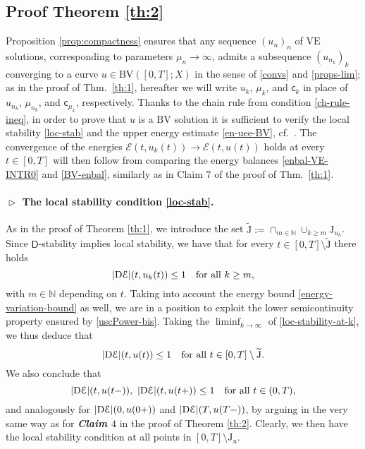 \documentclass[a4paper,10pt,reqno]{amsart} %
\newcommand{\N}{\mathbb{N}}
\numberwithin{equation}{section}
\def\rmD{{\mathrm D}} \def\rmE{{\mathrm E}} \def\rmF{{\mathrm F}}
\newcommand{\Xs}{X}
\newcommand{\BV}{\mathrm{BV}}
\newcommand{\ene}[2]{\mathcal{E}(#1,#2)}
\newcommand{\cmdn}{\mathsf{D}}
\newcommand{\lli}[2]{{#1}({#2}{-})}
\newcommand{\rli}[2]{{#1}({#2}{+})}
\newcommand{\jump}[1]{\mathrm{J}_{#1}}
\newcommand{\tjump}{\widetilde{\mathrm{J}}}
\newcommand{\vecostnamep}[1]{\mathsf{c}_{#1}}
\newcommand{\VE}{\mathrm{VE}}
\newcommand{\slope}[3]{|\rmD {#1}|(#2,#3)}
\begin{document}
\subsection{Proof Theorem \ref{th:2}}
\label{ss:4.2}
Proposition \ref{prop:compactness} ensures that any sequence
 $(u_n)_n$ of  $\VE$ solutions, corresponding to parameters $\mu_n\to\infty$, admits a subsequence
  	$(u_{n_k})_k$  converging to a curve   $u\in \BV([0,T];\Xs)$ in the sense of   \eqref{convs} and  \eqref{props-lim};  as in the proof of Thm.\ \ref{th:1},  hereafter %
	we will write $u_k$,  $\mu_k$, and  $\vecostnamep k$ in place of 
	$u_{n_k}$, $\mu_{n_k}$, and 
	$\vecostnamep{\mu_{k}}$, respectively. 
Thanks  to the  chain rule from condition \eqref{ch-rule-ineq},  
 in order to prove  that $u$ is a $\BV$ solution it is  sufficient to verify  the local stability \eqref{loc-stab} and the upper energy estimate \eqref{en-uee-BV}, cf.\ 
\cite[Prop.\ 4.2, Thm.\ 4.3]{MRS12}.
The convergence of the energies  $\ene t{u_k(t)} \to \ene t{u(t)}$ holds at every $t\in [0,T]$ will then follow from comparing the energy balances  \eqref{enbal-VE-INTR0} and 
\eqref{BV-enbal}, similarly as in Claim $7$ of the proof of Thm.\ \ref{th:1}. 
\paragraph{\bf $\vartriangleright$ The local stability condition \eqref{loc-stab}.}
As in the proof of Theorem \ref{th:1}, we introduce the set 
$\tjump := \cap_{m\in \N} \cup_{k\geq m} \jump{u_{k}}$. Since 
 $\cmdn$-stability implies local stability, 
we have that for every $t \in [0,T]\setminus \tjump$ there holds
\begin{equation}
\label{loc-stability-at-k}
\slope \calE t{u_{k}(t)}\leq 1 \quad \text{for all }  k \geq m,
\end{equation}
with $m\in \N$ depending on $t$. 
Taking into  account the energy bound \eqref{energy-variation-bound} as well, we are in a position to exploit the lower semicontinuity property ensured by 
\eqref{uscPower-bis}. Taking the $\liminf_{k\to\infty}$ of \eqref{loc-stability-at-k}, we thus deduce that 
\begin{equation}
\label{loc-stability-at-tjump}
\slope \calE t{u(t)} \leq 1 \quad \text{for all } t \in [0,T]\setminus \tjump.
\end{equation}
We also conclude that 
\begin{equation}
\label{loc-stability-at-left-right-lims}
\slope \calE t{\lli u t},\ \slope \calE t{\rli u t}\leq 1 \quad \text{for all } t \in (0,T),
\end{equation}
and analogously for $\slope \calE 0{\rli u0}$ and $\slope \calE T{\lli uT}$, by arguing in the very same way as for \emph{\bf Claim $4$} in the proof of  Theorem \ref{th:2}. 
Clearly, we  then have the local stability condition at all points in $[0,T]\setminus \jump u$.
\\
\end{document}
